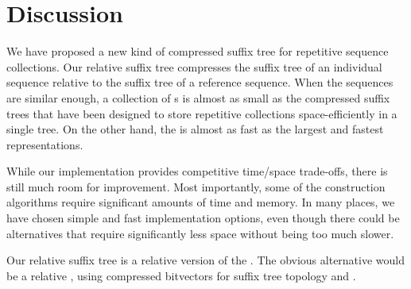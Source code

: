 \section{Discussion}\label{section:discussion}

We have proposed a new kind of compressed suffix tree for repetitive sequence collections. Our relative suffix tree compresses the suffix tree of an individual sequence relative to the suffix tree of a reference sequence. When the sequences are similar enough, a collection of \RST{}s is almost as small as the compressed suffix trees that have been designed to store repetitive collections space-efficiently in a single tree. On the other hand, the \RST{} is almost as fast as the largest and fastest \CST{} representations.

While our \RST{} implementation provides competitive time/space trade-offs, there is still much room for improvement. Most importantly, some of the construction algorithms require significant amounts of time and memory. In many places, we have chosen simple and fast implementation options, even though there could be alternatives that require significantly less space without being too much slower.

Our relative suffix tree is a relative version of the \CSTnpr. The obvious alternative would be a relative \CSTsada, using \RLZ{} compressed bitvectors for suffix tree topology and \PLCP.

